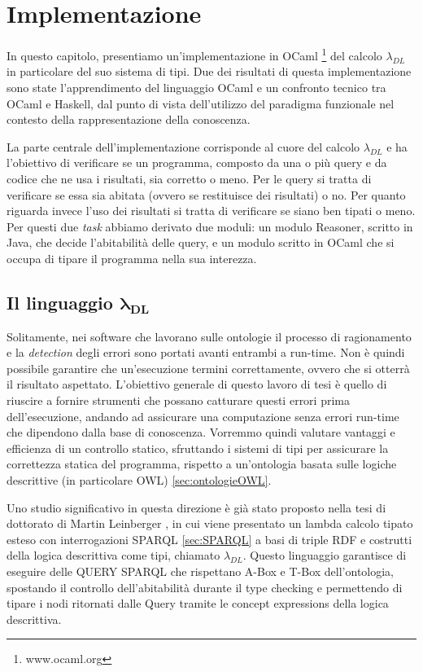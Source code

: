\chapter[Implementazione]{Implementazione}
\label{chap:Implementazione}
In questo capitolo, presentiamo un'implementazione in OCaml \footnote{www.ocaml.org} del calcolo $\lambda_{DL}$ \cite{leinbergerphdthesis} in particolare del suo sistema di tipi. Due dei risultati di questa implementazione sono state l'apprendimento del linguaggio OCaml e un confronto tecnico tra OCaml e Haskell, dal punto di vista dell'utilizzo del paradigma funzionale nel contesto della rappresentazione della conoscenza.

La parte centrale dell'implementazione corrisponde al cuore del calcolo $\lambda_{DL}$ e  ha l'obiettivo di verificare se un programma, composto da una o più query e da codice che ne usa i risultati, sia corretto o meno. Per le query si tratta di verificare se essa sia abitata (ovvero se restituisce dei risultati) o no. Per quanto riguarda invece l'uso dei risultati si tratta di verificare se siano ben tipati o meno. Per questi due \emph{task} abbiamo derivato due moduli: un modulo Reasoner, scritto in Java, che decide l'abitabilità delle query, e un modulo scritto in OCaml che si occupa di tipare il programma nella sua interezza.

\section{Il linguaggio $\boldsymbol{\lambda_{DL}}$}
    Solitamente, nei software che lavorano sulle ontologie il processo di ragionamento e la \emph{detection} degli errori sono portati avanti entrambi a run-time. Non è quindi possibile garantire che un'esecuzione termini correttamente, ovvero che si otterrà il risultato aspettato. 
    L'obiettivo generale di questo lavoro di tesi è quello di riuscire a fornire strumenti che possano catturare questi errori prima dell'esecuzione, andando ad assicurare una computazione senza errori run-time che dipendono dalla base di conoscenza. 
    Vorremmo quindi valutare vantaggi e efficienza di un controllo statico, sfruttando i sistemi di tipi per assicurare la correttezza statica del programma, rispetto a 
    un'ontologia basata sulle logiche descrittive (in particolare OWL) \ref{sec:ontologieOWL}.
    
Uno studio significativo in questa direzione è già stato proposto nella tesi di dottorato di Martin Leinberger \cite{leinbergerphdthesis}, 
    in cui viene presentato un lambda calcolo tipato esteso con interrogazioni SPARQL \ref{sec:SPARQL} a basi di triple RDF e costrutti della logica descrittiva come tipi, chiamato $\lambda_{DL}$. Questo linguaggio garantisce di eseguire delle QUERY SPARQL che rispettano A-Box e T-Box dell'ontologia, spostando il controllo dell'abitabilità durante il type checking e
permettendo di tipare i nodi ritornati dalle Query tramite le concept expressions della logica descrittiva.
    
